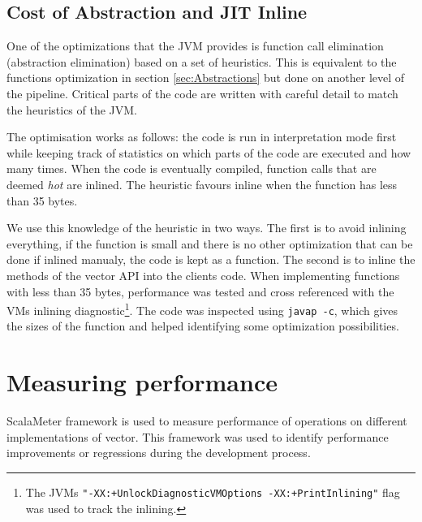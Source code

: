 \subsection{Cost of Abstraction and JIT Inline}
One of the optimizations that the JVM provides is function call elimination (abstraction elimination) based on a set of heuristics. This is equivalent to the functions optimization in section \ref{sec:Abstractions} but done on another level of the pipeline. Critical parts of the code are written with careful detail to match the heuristics of the JVM. 

The optimisation works as follows: the code is run in interpretation mode first while keeping track of statistics on which parts of the code are executed and how many times. When the code is eventually compiled, function calls that are deemed \emph{hot} are inlined. The heuristic favours inline when the function has less than 35 bytes. 

We use this knowledge of the heuristic in two ways. The first is to avoid inlining everything, if the function is small and there is no other optimization that can be done if inlined manualy, the code is kept as a function. The second is to inline the methods of the vector API into the clients code. When implementing functions with less than 35 bytes, performance was tested and cross referenced with the VMs inlining diagnostic\footnote{The JVMs \texttt{"-XX:+UnlockDiagnosticVMOptions -XX:+PrintInlining"} flag was used to track the inlining.}. The code was inspected using \texttt{javap -c}, which gives the sizes of the function and helped identifying some optimization possibilities.

\clearpage
\section{Measuring performance}
\label{Measuringperformance}
ScalaMeter framework\cite{scalameter} is used to measure performance of operations on different implementations of vector. This framework was used to identify performance improvements or regressions during the development process. 

